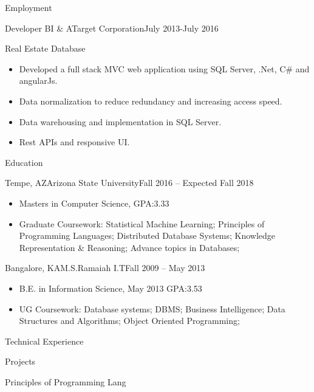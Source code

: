 \documentclass[]{nakulcv}
\begin{document}
	\makeheader
	
	\begin{cvsection}{Employment}
		\begin{cvsubsection}{Developer BI \& A}{Target Corporation}{July 2013-July 2016}
		\begin{cvsubsection}{Real Estate Database}{}{}
				\begin{itemize}
					\item	Developed a full stack MVC web application using SQL Server, .Net, C\# and angularJs.
					\item Data normalization to reduce redundancy and increasing access speed.
					\item Data warehousing and implementation in SQL Server.
					\item Rest APIs and responsive UI.
				\end{itemize}
			\end{cvsubsection}
	\begin{cvsection}{Education}
		\begin{cvsubsection}{Tempe, AZ}{Arizona State University}{Fall 2016 -- Expected Fall 2018}
			\begin{itemize}
				\item Masters in Computer Science, GPA:3.33
				\item Graduate Coursework: Statistical Machine Learning; Principles of Programming Languages; Distributed Database Systems; Knowledge Representation \& Reasoning; Advance topics in Databases;
			\end{itemize}
		\end{cvsubsection}
		\begin{cvsubsection}{Bangalore, KA}{M.S.Ramaiah I.T}{Fall 2009 -- May 2013}
			\begin{itemize}
				\item B.E. in Information Science, May 2013 GPA:3.53
				\item UG Coursework: Database systems; DBMS; Business Intelligence; Data Structures and Algorithms; Object Oriented Programming;
			\end{itemize}
		\end{cvsubsection}
	\end{cvsection}
	\begin{cvsection}{Technical Experience}
		\begin{cvsubsection}{Projects}{}{}
			\begin{cvsubsection}{Principles of Programming Lang}{}{}
			\begin{itemize}

\end{itemize}
\end{cvsubsection}
\end{cvsubsection}
\end{cvsection}
\end{cvsubsection}
\end{cvsection}
\end{document}
